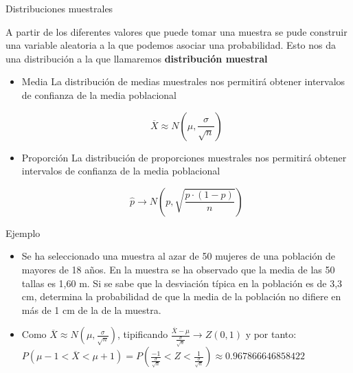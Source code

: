\documentclass[11pt,handout]{beamer}
\begin{document}
\begin{frame}{Distribuciones muestrales}
\begin{block}{} A partir de los diferentes valores que puede tomar una muestra se pude construir una variable aleatoria a la que podemos asociar una probabilidad. Esto nos da una distribución a la que llamaremos \textbf{distribución muestral}

\end{block}    
\pause
\begin{itemize}[<+->]
    \item{Media} La distribución de medias muestrales nos permitirá obtener intervalos de confianza de la media poblacional
    \begin{block}{}
        $$\overline{X} \approx N\left(\mu,\frac{\sigma}{\sqrt{n}}\right)$$
    \end{block}

    \item{Proporción} La distribución de proporciones muestrales nos permitirá obtener intervalos de confianza de la media poblacional
    \begin{block}{}
    $$\widehat{p} \rightarrow N \left ( p , \sqrt{ \frac{p \cdot (1-p)} {n}}\right )$$
    \end{block}
    
\end{itemize}

\end{frame}

\begin{frame}{Ejemplo}


\begin{itemize}[<+->]
    \item  Se ha seleccionado una muestra al azar de 50 mujeres de una población de mayores
de 18 años. En la muestra se ha observado que la media de las 50 tallas es 1,60 m. Si se sabe que
la desviación típica en la población es de 3,3 cm, determina la probabilidad de que la
media de la población no difiere en más de 1 cm de la de la muestra. 
    \item Como $\overline{X} \approx N\left(\mu,\frac{\sigma}{\sqrt{n}}\right)$, tipificando $\frac{\overline{X} -\mu}{\frac{\sigma}{\sqrt{n}}} \rightarrow Z(0,1)$ y por tanto: $P(\mu-1 < \overline{X} < \mu +1)=P(\frac{-1}{\frac{\sigma}{\sqrt{n}}} < Z < \frac{1}{\frac{\sigma}{\sqrt{n}}})\approx 0.967866646858422$
    
\end{itemize}

\end{frame}
\end{document}
